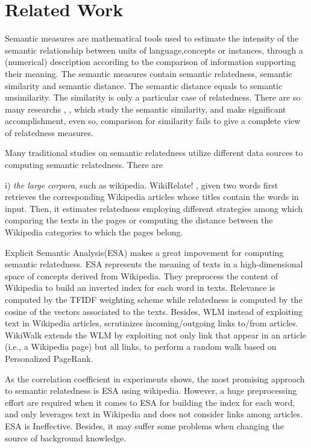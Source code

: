 \section{Related Work}
\label{related-word}
Semantic measures are mathematical tools used to estimate the intensity of the 
semantic relationship between units of language,concepts or instances, through 
a (numerical) description according to the comparison of information 
supporting their meaning. The semantic measures contain semantic relatedness,
semantic similarity and semantic distance. The semantic distance equals to semantic 
unsimilarity. The similarity is only a particular case of relatedness.
There are so many researchs \cite{acl/IacobacciPN15}, \cite{tkde/ZhuI17}, \cite{tkde/LiBM03}
which study the semantic similarity, and make significant accomplishment, even so,
comparison for similarity fails to give a complete view of relatedness measures.

Many traditional studies on semantic relatedness
utilize different data sources to computing semantic relatedness. There are

i) \emph{the large corpora}, such as wikipedia. 
WikiRelate! \cite{aaai/StrubeP06}, given two words
first retrieves the corresponding Wikipedia articles whose titles
contain the words in input. Then, it estimates relatedness
employing different strategies among which comparing
the texts in the pages or computing the distance between
the Wikipedia categories to which the pages belong.

Explicit Semantic Analysis(ESA) \cite{ijcai/GabrilovichM07} makes a great impovement for computing semantic relatedness. 
ESA represents the meaning of texts in a high-dimensional space of concepts derived from Wikipedia.
They preprocess the content of Wikipedia to build an inverted index for each word in texts.
Relevance is computed by the TFIDF weighting scheme while relatedness is computed by
the cosine of the vectors associated to the texts.
Besides, WLM \cite{aaai/Milne08} instead of exploiting text in Wikipedia articles, 
scrutinizes incoming/outgoing links to/from articles. WikiWalk \cite{textgraphs/YehRMAS09} extends the
WLM by exploiting not only link that appear in an article (i.e., a Wikipedia page) but all 
links, to perform a random walk based on Personalized PageRank.

As the correlation coefficient in experiments shows, the most promising approach to semantic relatedness
is ESA using wikipedia. 
However, a huge preprocessing effort are required when it comes to ESA for building the index for each word,
and only leverages text in Wikipedia and does not consider links among articles. ESA is Ineffective.
Besides, it may suffer some problems when changing the source of background knowledge.

